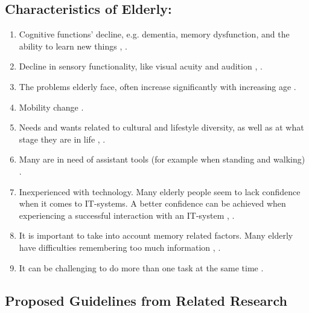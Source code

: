 \subsection{Characteristics of Elderly:}
\label{subsec:characteristics}
\begin{enumerate}[{c}.1]
\item Cognitive functions' decline, e.g. dementia, memory dysfunction, and the ability to learn new things \cite{Billis}, \cite{gregor}.
\item Decline in sensory functionality, like  visual acuity and audition \cite{Billis}, \cite{gregor}.
\item The problems elderly face, often increase significantly with increasing age \cite{gregor}.
\item Mobility change \cite{Billis}.
\item Needs and wants related to cultural and lifestyle diversity, as well as at what stage they are in life \cite{Billis}, \cite{gregor}.
\item Many are in need of assistant tools (for example when standing and walking) \cite{gregor}.
\item Inexperienced with technology. Many elderly people seem to lack confidence when it comes to IT-systems. A better confidence can be achieved when experiencing a successful interaction with an IT-system \cite{Billis}, \cite{gregor}.
\item It is important to take into account memory related factors. Many elderly have difficulties remembering too much information \cite{Billis}, \cite{gregor}.
\item It can be challenging to do more than one task at the same time \cite{bruin}.
\end{enumerate}

\subsection{Proposed Guidelines from Related Research}
\label{subsec:guidelines}

